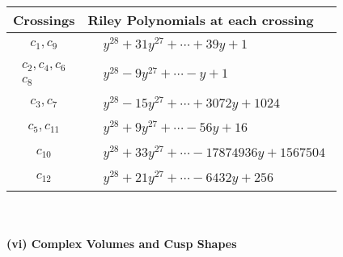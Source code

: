 \documentclass[1p]{elsarticle_modified}
\theoremstyle{definition}
\begin{document}
\begin{tabular}{m{50pt}|m{274pt}}
Crossings & \hspace{64pt}Riley Polynomials at each crossing \\
\hline $$\begin{aligned}c_{1},c_{9}\end{aligned}$$&$\begin{aligned}
&y^{28}+31 y^{27}+\cdots+39 y+1
\end{aligned}$\\
\hline $$\begin{aligned}c_{2},c_{4},c_{6}\\c_{8}\end{aligned}$$&$\begin{aligned}
&y^{28}-9 y^{27}+\cdots- y+1
\end{aligned}$\\
\hline $$\begin{aligned}c_{3},c_{7}\end{aligned}$$&$\begin{aligned}
&y^{28}-15 y^{27}+\cdots+3072 y+1024
\end{aligned}$\\
\hline $$\begin{aligned}c_{5},c_{11}\end{aligned}$$&$\begin{aligned}
&y^{28}+9 y^{27}+\cdots-56 y+16
\end{aligned}$\\
\hline $$\begin{aligned}c_{10}\end{aligned}$$&$\begin{aligned}
&y^{28}+33 y^{27}+\cdots-17874936 y+1567504
\end{aligned}$\\
\hline $$\begin{aligned}c_{12}\end{aligned}$$&$\begin{aligned}
&y^{28}+21 y^{27}+\cdots-6432 y+256
\end{aligned}$\\
\hline
\end{tabular}\\~\\
\newpage\flushleft \textbf{(vi) Complex Volumes and Cusp Shapes}
\end{document}
